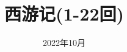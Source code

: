 \documentclass[fontset=none, punct=kaiming]{ctexart}
\title{西游记(1-22回)}
\date{2022年10月}
\begin{document}
\maketitle


\begin{paracol}{2}

\end{paracol}


\end{document}
